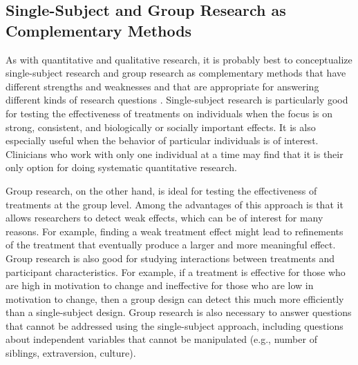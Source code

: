 \subsection{Single-Subject and Group Research as Complementary Methods}


As with quantitative and qualitative research, it is probably best to conceptualize single-subject research and group research as complementary methods that have different strengths and weaknesses and that are appropriate for answering different kinds of research questions \citep{kazdin_single-case_2011}. Single-subject research is particularly good for testing the effectiveness of treatments on individuals when the focus is on strong, consistent, and biologically or socially important effects. It is also especially useful when the behavior of particular individuals is of interest. Clinicians who work with only one individual at a time may find that it is their only option for doing systematic quantitative research.


Group research, on the other hand, is ideal for testing the effectiveness of treatments at the group level. Among the advantages of this approach is that it allows researchers to detect weak effects, which can be of interest for many reasons. For example, finding a weak treatment effect might lead to refinements of the treatment that eventually produce a larger and more meaningful effect. Group research is also good for studying interactions between treatments and participant characteristics. For example, if a treatment is effective for those who are high in motivation to change and ineffective for those who are low in motivation to change, then a group design can detect this much more efficiently than a single-subject design. Group research is also necessary to answer questions that cannot be addressed using the single-subject approach, including questions about independent variables that cannot be manipulated (e.g., number of siblings, extraversion, culture).


